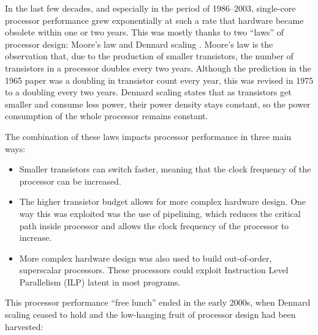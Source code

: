 \documentclass[12pt,a4paper,oneside,openright]{report}
\begin{document}
In the last few decades, and especially in the period of 1986--2003,
single-core processor performance grew exponentially at such a rate
that hardware became obsolete within one or two years. This was mostly
thanks to two ``laws'' of processor design: Moore's law
\cite{MooreLaw} and Dennard scaling \cite{DennardScaling}. Moore's law
is the observation that, due to the production of smaller transistors,
the number of transistors in a processor doubles every two
years. Although the prediction in the 1965 paper was a doubling in
transistor count every year, this was revised in 1975 to a doubling
every two years. Dennard scaling states that as transistors get
smaller and consume less power, their power density stays constant, so
the power consumption of the whole processor remains constant.

The combination of these laws impacts processor performance in three
main ways:

\begin{itemize}
\item Smaller transistors can switch faster, meaning that the clock
  frequency of the processor can be increased.
  
\item The higher transistor budget allows for more complex hardware
  design. One way this was exploited was the use of pipelining, which
  reduces the critical path inside processor and allows the clock
  frequency of the processor to increase.
  
\item More complex hardware design was also used to build
  out-of-order, superscalar processors. These processors could exploit
  Instruction Level Parallelism (ILP) \cite[Chapter~3]{CompArchBook}
  latent in most programs.
\end{itemize}
This processor performance ``free lunch'' \cite{FreeLunchIsOver} ended
in the early 2000s, when Dennard scaling ceased to hold and the
low-hanging fruit of processor design had been harvested:
\end{document}
